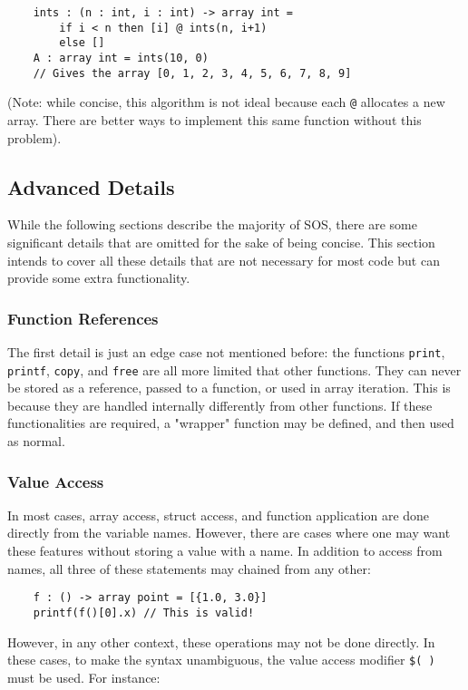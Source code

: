 \documentclass[main.tex]{subfiles}
\begin{document}
	\begin{lstlisting}
	ints : (n : int, i : int) -> array int =
	    if i < n then [i] @ ints(n, i+1)
	    else []
	A : array int = ints(10, 0)
	// Gives the array [0, 1, 2, 3, 4, 5, 6, 7, 8, 9] \end{lstlisting}
	
	(Note: while concise, this algorithm is not ideal because each \texttt{@} allocates a new array. There are better ways to implement this same function without this problem).
	
	\subsection{Advanced Details}
	While the following sections describe the majority of SOS, there are some significant details that are omitted for the sake of being concise. This section intends to cover all these details that are not necessary for most code but can provide some extra functionality.
	
	\subsubsection{Function References}
	The first detail is just an edge case not mentioned before: the functions \texttt{print}, \texttt{printf}, \texttt{copy}, and \texttt{free} are all more limited that other functions. They can never be stored as a reference, passed to a function, or used in array iteration. This is because they are handled internally differently from other functions. If these functionalities are required, a "wrapper" function may be defined, and then used as normal.
	
	\subsubsection{Value Access}
	In most cases, array access, struct access, and function application are done directly from the variable names. However, there are cases where one may want these features without storing a value with a name. In addition to access from names, all three of these statements may chained from any other:
	
	\begin{lstlisting}
	f : () -> array point = [{1.0, 3.0}]
	printf(f()[0].x) // This is valid! \end{lstlisting} 
	
	However, in any other context, these operations may not be done directly. In these cases, to make the syntax unambiguous, the value access modifier \texttt{\$( )} must be used. For instance:
	
\end{document}
